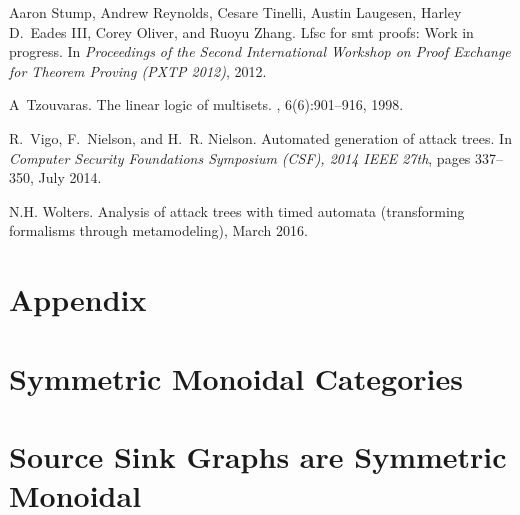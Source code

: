 \documentclass{sigplanconf}
\begin{document}
\begin{thebibliography}{10}
  Aaron Stump, Andrew Reynolds, Cesare Tinelli, Austin Laugesen, Harley D.~Eades
  III, Corey Oliver, and Ruoyu Zhang.
  \newblock Lfsc for smt proofs: Work in progress.
  \newblock In {\em Proceedings of the Second International Workshop on Proof
    Exchange for Theorem Proving (PXTP 2012)}, 2012.

  A~Tzouvaras.
  \newblock The linear logic of multisets.
  , 6(6):901--916, 1998.

  R.~Vigo, F.~Nielson, and H.~R. Nielson.
  \newblock Automated generation of attack trees.
  \newblock In {\em Computer Security Foundations Symposium (CSF), 2014 IEEE
    27th}, pages 337--350, July 2014.

  N.H. {Wolters}.
  \newblock Analysis of attack trees with timed automata (transforming formalisms
  through metamodeling), March 2016.

\end{thebibliography}


\appendix

\section*{Appendix}
\label{sec:appendix}
\section{Symmetric Monoidal Categories}
\label{sec:symmetric_monoidal_categories}


\section{Source Sink Graphs are Symmetric Monoidal}
\label{sec:source_sink_graphs_are_symmetric_monoidal}

\end{document}
